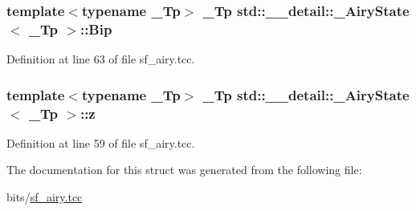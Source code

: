 \subsubsection[{\texorpdfstring{Bip}{Bip}}]{\setlength{\rightskip}{0pt plus 5cm}template$<$typename \+\_\+\+Tp$>$ \+\_\+\+Tp {\bf std\+::\+\_\+\+\_\+detail\+::\+\_\+\+Airy\+State}$<$ \+\_\+\+Tp $>$\+::Bip}\hypertarget{structstd_1_1____detail_1_1__AiryState_a150eaeb1b7b0ab87dd68381d1156d433}{}\label{structstd_1_1____detail_1_1__AiryState_a150eaeb1b7b0ab87dd68381d1156d433}


Definition at line 63 of file sf\+\_\+airy.\+tcc.

\subsubsection[{\texorpdfstring{z}{z}}]{\setlength{\rightskip}{0pt plus 5cm}template$<$typename \+\_\+\+Tp$>$ \+\_\+\+Tp {\bf std\+::\+\_\+\+\_\+detail\+::\+\_\+\+Airy\+State}$<$ \+\_\+\+Tp $>$\+::z}\hypertarget{structstd_1_1____detail_1_1__AiryState_ac19aba6567e1c3735ed68d46bb13a1d4}{}\label{structstd_1_1____detail_1_1__AiryState_ac19aba6567e1c3735ed68d46bb13a1d4}


Definition at line 59 of file sf\+\_\+airy.\+tcc.



The documentation for this struct was generated from the following file\+:\begin{DoxyCompactItemize}
\item 
bits/\hyperlink{sf__airy_8tcc}{sf\+\_\+airy.\+tcc}\end{DoxyCompactItemize}
